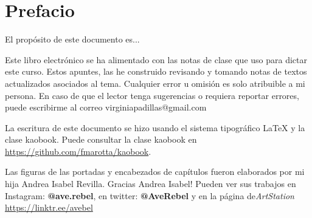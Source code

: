 \setchapterpreamble[u]{\margintoc}

\chapter{Prefacio}
 
 El prop\'osito de este documento es...
 
Este libro electr\'onico se ha alimentado con las notas  de clase que uso para dictar este curso. Estos apuntes, las he construido revisando y tomando notas de textos actualizados asociados al tema.  Cualquier error u omisi\'on es solo atribuible a mi persona. En caso de que el lector tenga sugerencias o requiera reportar errores, puede escribirme al correo  virginiapadillas@gmail.com 

La escritura de este documento se hizo usando  el sistema  tipogr\'afico   \LaTeX{} y la clase {kaobook}. 
Puede consultar la clase {kaobook}   en  \url{ https://github.com/fmarotta/kaobook}. 

Las figuras de las portadas y  encabezados de  cap\'itulos fueron elaborados por mi hija Andrea Isabel Revilla. Gracias Andrea Isabel! Pueden ver sus trabajos en  Instagram: \textbf{@ave.rebel}, en twitter: \textbf{@AveRebel}  y en la p\'agina de\textit \textit{ArtStation} \url{https://linktr.ee/avebel}    

